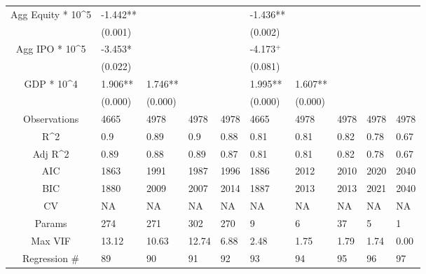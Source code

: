 \documentclass{article}
\begin{document}
\begin{table}[H]
\begin{tabular}{|clllllllll|}
  Agg Equity * 10^5 & -1.442** &  &  &  & -1.436** &  &  &  &  \\ 
   & (0.001) &  &  &  & (0.002) &  &  &  &  \\ 
  Agg IPO * 10^5 & -3.453* &  &  &  & -4.173$^{+}$ &  &  &  &  \\ 
   & (0.022) &  &  &  & (0.081) &  &  &  &  \\ 
  GDP * 10^4 & 1.906** & 1.746** &  &  & 1.995** & 1.607** &  &  &  \\ 
   & (0.000) & (0.000) &  &  & (0.000) & (0.000) &  &  &  \\ 
  \hline 
 Observations & 4665 & 4978 & 4978 & 4978 & 4665 & 4978 & 4978 & 4978 & 4978 \\ 
  R^2 & 0.9 & 0.89 & 0.9 & 0.88 & 0.81 & 0.81 & 0.82 & 0.78 & 0.67 \\ 
  Adj R^2 & 0.89 & 0.88 & 0.89 & 0.87 & 0.81 & 0.81 & 0.82 & 0.78 & 0.67 \\ 
  AIC & 1863 & 1991 & 1987 & 1996 & 1886 & 2012 & 2010 & 2020 & 2040 \\ 
  BIC & 1880 & 2009 & 2007 & 2014 & 1887 & 2013 & 2013 & 2021 & 2040 \\ 
  CV & NA & NA & NA & NA & NA & NA & NA & NA & NA \\ 
  Params & 274 & 271 & 302 & 270 & 9 & 6 & 37 & 5 & 1 \\ 
  Max VIF & 13.12 & 10.63 & 12.74 & 6.88 & 2.48 & 1.75 & 1.79 & 1.74 & 0.00 \\ 
  Regression \# & 89 & 90 & 91 & 92 & 93 & 94 & 95 & 96 & 97 \\ 
   \hline
\end{tabular}
 
\end{table}
\end{document}
